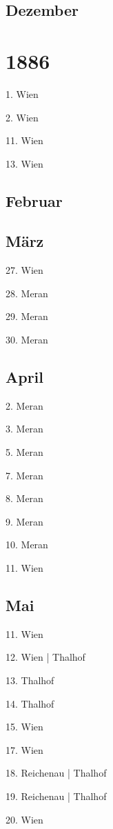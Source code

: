 \documentclass[twoside=false,titlepage=false,open=any, parskip=never, fontsize=10pt, headings=small, chapterprefix=false, appendixprefix=false, DIV=15]{scrbook}
\begin{document}
\begin{multicols}{3}
            \section*{Dezember}
            \chapter*{1886}
            1. Wien\par
            2. Wien\par
            11. Wien\par
            13. Wien\par
            \section*{Februar}
            \section*{März}
            27. Wien\par
            28. Meran\par
            29. Meran\par
            30. Meran\par
            \section*{April}
            2. Meran\par
            3. Meran\par
            5. Meran\par
            7. Meran\par
            8. Meran\par
            9. Meran\par
            10. Meran\par
            11. Wien\par
            \section*{Mai}
            11. Wien\par
            12. Wien | Thalhof\par
            13. Thalhof\par
            14. Thalhof\par
            15. Wien\par
            17. Wien\par
            18. Reichenau | Thalhof\par
            19. Reichenau | Thalhof\par
            20. Wien\par

\end{multicols}
\end{document}
